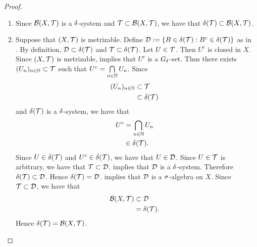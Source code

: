 \documentclass{book}
\begin{document}
	\begin{proof}\
		\begin{enumerate}
			\item Since $\mathcal{B}(X, \mathcal{T})$ is a $\delta$-system and $\mathcal{T} \subset \mathcal{B}(X, \mathcal{T})$, we have that $\delta(\mathcal{T}) \subset \mathcal{B}(X, \mathcal{T})$. 
			\item Suppose that $(X, \mathcal{T})$ is metrizable. Define $\mathcal{D} \vcentcolon= \{B \in \delta(\mathcal{T}): B^c \in \delta(\mathcal{T})\}$ as in . By definition, $\mathcal{D} \subset \delta(\mathcal{T})$ and $\mathcal{T} \subset \delta(\mathcal{T})$. Let $U \in \mathcal{T}$. Then $U^c$ is closed in $X$. Since $(X, \mathcal{T})$ is metrizable,  implies that $U^c$ is a $G_{\delta}$-set. Thus there exists $(U_n)_{n \in \mathbb{N}} \subset \mathcal{T}$ such that $U^c = \bigcap\limits_{n \in \mathbb{N}} U_n$. Since 
			\begin{align*}
				(U_n)_{n \in \mathbb{N}} 
				& \subset \mathcal{T} \\
				& \subset \delta(\mathcal{T})
			\end{align*} 
			and $\delta(\mathcal{T})$ is a $\delta$-system, we have that 
			\begin{align*}
				U^c
				& = \bigcap\limits_{n \in \mathbb{N}} U_n \\
				& \in \delta(\mathcal{T}).
			\end{align*}
			Since $U \in \delta(\mathcal{T})$ and $U^c \in \delta(\mathcal{T})$, we have that $U \in \mathcal{D}$. Since $U \in \mathcal{T}$ is arbitrary, we have that $\mathcal{T} \subset \mathcal{D}$.  implies that $\mathcal{D}$ is a $\delta$-system. Therefore $\delta(\mathcal{T}) \subset \mathcal{D}$. Hence $\delta(\mathcal{T}) = \mathcal{D}$.  implies that $\mathcal{D}$ is a $\sigma$-algebra on $X$. Since $\mathcal{T} \subset \mathcal{D}$, we have that  
			\begin{align*}
				\mathcal{B}(X, \mathcal{T})
				& \subset \mathcal{D} \\
				& = \delta(\mathcal{T}).
			\end{align*}
			Hence $\delta(\mathcal{T}) = \mathcal{B}(X, \mathcal{T})$. 
		\end{enumerate}
	\end{proof}
\end{document}

